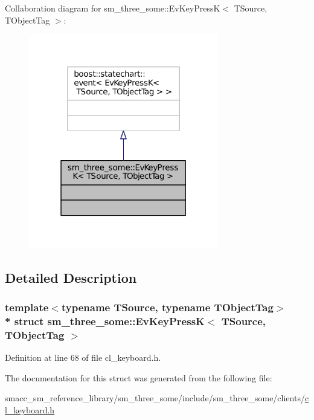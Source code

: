 Collaboration diagram for sm\+\_\+three\+\_\+some\+:\+:Ev\+Key\+PressK$<$ T\+Source, T\+Object\+Tag $>$\+:
\nopagebreak
\begin{figure}[H]
\begin{center}
\leavevmode
\includegraphics[width=235pt]{structsm__three__some_1_1EvKeyPressK__coll__graph}
\end{center}
\end{figure}


\subsection{Detailed Description}
\subsubsection*{template$<$typename T\+Source, typename T\+Object\+Tag$>$\\*
struct sm\+\_\+three\+\_\+some\+::\+Ev\+Key\+Press\+K$<$ T\+Source, T\+Object\+Tag $>$}



Definition at line 68 of file cl\+\_\+keyboard.\+h.



The documentation for this struct was generated from the following file\+:\begin{DoxyCompactItemize}
\item 
smacc\+\_\+sm\+\_\+reference\+\_\+library/sm\+\_\+three\+\_\+some/include/sm\+\_\+three\+\_\+some/clients/\hyperlink{cl__keyboard_8h}{cl\+\_\+keyboard.\+h}\end{DoxyCompactItemize}
